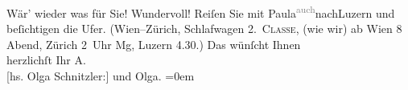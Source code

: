 \begin{ledgroupsized}[t]{13cm}
           \pstart
           {\pb}Wär’ wieder was für Sie! Wundervoll! Reiſen Sie mit
                  Paula\substVorne{}\textsuperscript{\textcolor{gray}{auch}}\substDazwischen{}nach\substHinten{}{ }Luzern und beſichtigen die Ufer. (Wien–Zürich,
               Schlafwagen 2. \textsc{Classe}, (wie wir) ab Wien 8 Abend, Zürich 2 Uhr
                  \introOben{}Mg\introOben{}, Luzern 4.30.)\pend
           \pstart
           Das wünſcht Ihnen{\\[\baselineskip]}herzlichſt Ihr \spacefill\mbox{A.}{\\[\baselineskip]}{[}hs. Olga Schnitzler:{]} und \spacefill\mbox{Olga.}\pend
           \leftskip=0em{}
         
         \endnumbering{}\end{ledgroupsized}  \newcommand{\dateiname}{L01933}\newcommand{\titel}{Arthur und Olga Schnitzler an Richard Beer-Hofmann, 22. 5. 1910}\newcommand{\editorInnen}{Martin Anton Müller und Gerd-Hermann Susen}
      